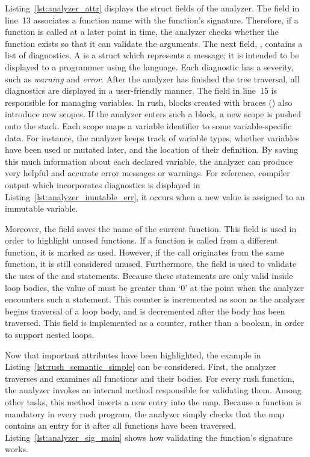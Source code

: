 Listing~\ref{lst:analyzer_attr} displays the struct fields of the analyzer.
The field  in line~13 associates a function name with the function's signature.
Therefore, if a function is called at a later point in time, the analyzer checks whether the function exists so that it can validate the arguments.
The next field, , contains a list of diagnostics.
A  is a struct which represents a message; it is intended to be displayed to a programmer using the language.
Each diagnostic has a severity, such as \emph{warning} and \emph{error}.
After the analyzer has finished the tree traversal, all diagnostics are displayed in a user-friendly manner.
The  field in line~15 is responsible for managing variables.
In rush, blocks created with braces (\qVerb{{}}) also introduce new scopes.
If the analyzer enters such a block, a new scope is pushed onto the  stack.
Each scope maps a variable identifier to some variable-specific data.
For instance, the analyzer keeps track of variable types, whether variables have been used or mutated later, and the location of their definition.
By saving this much information about each declared variable, the analyzer can produce very helpful and accurate error messages or warnings.
For reference, compiler output which incorporates diagnostics is displayed in Listing~\ref{lst:analyzer_imutable_err}, it occurs when a new value is assigned to an immutable variable.

Moreover, the field  saves the name of the current function.
This field is used in order to highlight unused functions.
If a function is called from a different function, it is marked as used.
However, if the call originates from the same function, it is still considered unused.
Furthermore, the  field is used to validate the uses of the  and  statements.
Because these statements are only valid inside loop bodies, the value of  must be greater than `0' at the point when the analyzer encounters such a statement.
This counter is incremented as soon as the analyzer begins traversal of a loop body, and is decremented after the body has been traversed.
This field is implemented as a counter, rather than a boolean, in order to support nested loops.

Now that important attributes have been highlighted, the example in Listing~\ref{lst:rush_semantic_simple} can be considered.
First, the analyzer traverses and examines all functions and their bodies.
For every rush function, the analyzer invokes an internal method responsible for validating them.
Among other tasks, this method inserts a new entry into the  map.
Because a  function is mandatory in every rush program,
the analyzer simply checks that the  map contains an entry for it after all functions have been traversed.
Listing~\ref{lst:analyzer_sig_main} shows how validating the  function's signature works.


